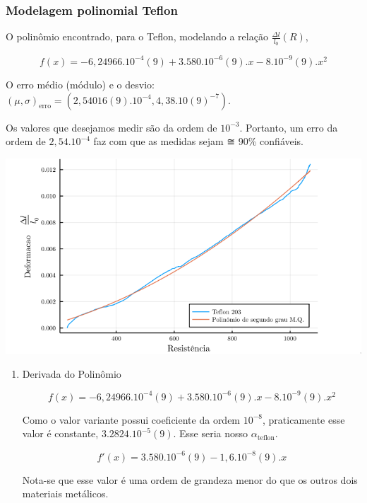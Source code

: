 \documentclass[11pt]{article}
\begin{document}
\subsubsection{Modelagem polinomial Teflon}
\label{sec:org0244453}
O polinômio encontrado, para o Teflon, modelando a relação \(\frac{\Delta l}{l_0}(R)\),

\begin{equation}
f(x)=-6,24966.10^{-4}(9) + 3.580.10^{-6}(9).x - 8.10^{-9}(9).x^2
\end{equation}

O erro médio (módulo) e o desvio: \((\mu, \sigma)_{\textrm{erro}} = (2,54016(9).10^{-4}, 4,38.10(9)^{-7})\).

Os valores que desejamos medir são da ordem de \(10^{-3}\). Portanto, um erro da ordem de \(2,54.10^{-4}\) faz com que as medidas sejam ≅ 90\% confiáveis.

\href{img/polinomio-aluminio203.png}{\includegraphics[width=.9\linewidth]{./img/polinomio-teflon.png}}

\begin{enumerate}
\item Derivada do Polinômio
\label{sec:org92223ec}

\begin{equation}
f(x)=-6,24966.10^{-4}(9) + 3.580.10^{-6}(9).x - 8.10^{-9}(9).x^2
\end{equation}

Como o valor variante possui coeficiente da ordem \(10^{-8}\), praticamente esse valor é constante, \(3.2824.10^{-5}(9)\). Esse seria nosso \(\alpha_{\textrm{teflon}}\).

\begin{equation}
f'(x)=3.580.10^{-6}(9) - 1,6.10^{-8}(9).x
\end{equation}

Nota-se que esse valor é uma ordem de grandeza menor do que os outros dois materiais metálicos.
\end{enumerate}
\end{document}
